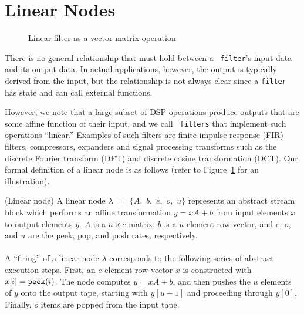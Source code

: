 \section{Linear Nodes}
\label{sec:linearrep}

\begin{figure}
\center
\epsfxsize=3.0in
\caption{Linear filter as a vector-matrix operation}
\label{fig:overview-matrix}
\vspace{-12pt}
\end{figure}

There is no general relationship that must hold between a {\tt
filter}'s input data and its output data. In actual applications,
however, the output is typically derived from the input, but the
relationship is not always clear since a {\tt filter} has state and
can call external functions.

However, we note that a large subset of DSP operations produce outputs
that are some affine function of their input, and we call {\tt
filters} that implement such operations ``linear.''  Examples of such
filters are finite impulse response (FIR) filters, compressors,
expanders and signal processing transforms such as the discrete
Fourier transform (DFT) and discrete cosine transformation (DCT).  Our
formal definition of a linear node is as follows (refer to
Figure~\ref{fig:overview-matrix} for an illustration).

\begin{definition}(Linear node)
A linear node $\lambda$ $=$ $\{A,$ $b,$ $e,$ $o,$ $u\}$ represents an
abstract stream block which performs an affine transformation $y = x A
+ b$ from input elements $x$ to output elements $y$.  $A$ is a $u
\times e$ matrix, $b$ is a $u$-element row vector, and $e$, $o$, and
$u$ are the peek, pop, and push rates, respectively. \\ ~ \\
%
A ``firing'' of a linear node $\lambda$ corresponds to the following
series of abstract execution steps.  First, an $e$-element row vector
$x$ is constructed with $x[i] = \mbox{\tt peek}(i)$.  The node
computes $y = x A + b$, and then pushes the $u$ elements of $y$ onto
the output tape, starting with $y[u-1]$ and proceeding through $y[0]$.
Finally, $o$ items are popped from the input tape.
\end{definition}


